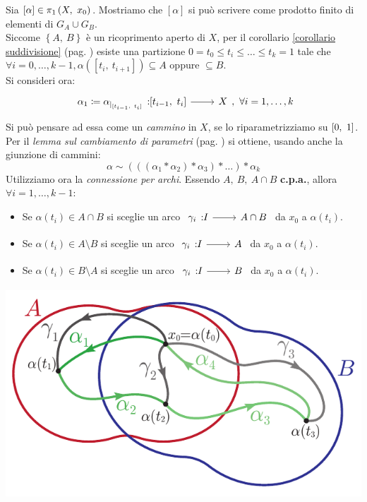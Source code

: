 \begin{demonstration} 
	Sia $[\alpha]\in\gruf{X}{x_0}$. Mostriamo che $[\alpha]$ si può scrivere come prodotto finito di elementi di $G_A\cup G_B$.\\
	Siccome $\left\{A,\ B\right\}$ è un ricoprimento aperto di $X$, per il corollario \ref{corollario suddivisione} (pag. \pageref{corollario suddivisione}) esiste una partizione $0=t_0\leq t_i\leq\dots\leq t_k=1$ tale che $\forall i=0,\dots,k-1, \alpha([t_i,\ t_{i+1}]) \subseteq A$ oppure $\subseteq B$. \\ 
	Si consideri ora:
	\begin{equation*}
		\funz {\alpha_1\coloneqq \alpha_{\mid_{[t_{i-1},\ t_i]}}} {[t_{i-1},\ t_i]} X,\ \forall i=1,\dots,k
	\end{equation*}
	Si può pensare ad essa come un \textit{cammino} in $X$, se lo riparametrizziamo su $\left[0,\ 1\right]$. Per il \textit{lemma  sul cambiamento di parametri} (pag. \pageref{cambiamentodiparametri}) si ottiene, usando anche la giunzione di cammini:
	\begin{equation*}
		\alpha\sim \left( \left( (\alpha_1 \ast \alpha_2)\ast \alpha_3 \right)\ast \ldots\right) \ast \alpha_k
	\end{equation*}
	Utilizziamo ora la \textit{connessione per archi}. Essendo $A,\ B,\ A\cap B$ \textbf{c.p.a.}, allora $\forall i=1,\dots,k-1$:
		\begin{itemize}
			\item Se $\alpha(t_i)\in A\cap B$ si sceglie un arco $\funz {\gamma_i} I {A\cap B}$ da $x_0$ a $\alpha(t_i)$.
			\item Se $\alpha(t_i)\in A\setminus B$ si sceglie un arco $\funz {\gamma_i} I {A}$ da $x_0$ a $\alpha(t_i)$.
			\item Se $\alpha(t_i)\in B\setminus A$ si sceglie un arco $\funz {\gamma_i} I {B}$ da $x_0$ a $\alpha(t_i)$.
		\end{itemize}
		\begin{center}
		\includegraphics[trim=0cm 0cm 0cm 0.2cm,clip,scale=0.8]{images/vankampenpaths.pdf}

\end{center}
\end{demonstration}
